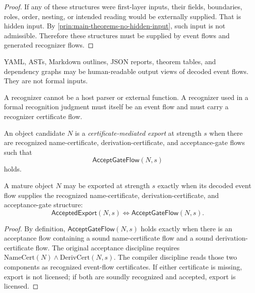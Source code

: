 \begin{proof}
If any of these structures were first-layer inputs, their fields, boundaries, roles, order, nesting, or intended reading would be externally supplied. That is hidden input. By \autoref{prin:main-theorems-no-hidden-input}, such input is not admissible. Therefore these structures must be supplied by event flows and generated recognizer flows.
\end{proof}

\begin{corollary}
\label{cor:main-theorems-yaml-ast-output-only}
YAML, ASTs, Markdown outlines, JSON reports, theorem tables, and dependency graphs may be human-readable output views of decoded event flows. They are not formal inputs.
\end{corollary}

\begin{corollary}
\label{cor:main-theorems-recognizer-generatedness}
A recognizer cannot be a host parser or external function. A recognizer used in a formal recognition judgment must itself be an event flow and must carry a recognizer certificate flow.
\end{corollary}

\begin{definition}
\label{def:main-theorems-certificate-mediated-export}
An object candidate $N$ is a \emph{certificate-mediated export} at strength $s$ when there are recognized name-certificate, derivation-certificate, and acceptance-gate flows such that
$$
  \mathsf{AcceptGateFlow}(N,s)
$$
holds.
\end{definition}

\begin{theorem}
\label{thm:main-theorems-accepted-export}
A mature object $N$ may be exported at strength $s$ exactly when its decoded event flow supplies the recognized name-certificate, derivation-certificate, and acceptance-gate structure:
$$
  \boxed{
  \mathsf{AcceptedExport}(N,s)
  \Longleftrightarrow
  \mathsf{AcceptGateFlow}(N,s).
  }
$$
\end{theorem}

\begin{proof}
By definition, $\mathsf{AcceptGateFlow}(N,s)$ holds exactly when there is an acceptance flow containing a sound name-certificate flow and a sound derivation-certificate flow. The original acceptance discipline requires $\mathrm{NameCert}(N)\wedge\mathrm{DerivCert}(N,s)$. The compiler discipline reads those two components as recognized event-flow certificates. If either certificate is missing, export is not licensed; if both are soundly recognized and accepted, export is licensed.
\end{proof}


